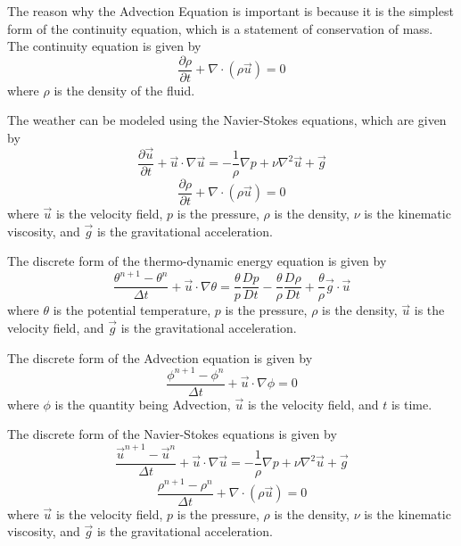 \documentclass{article}
\begin{document}
The reason why the Advection Equation is important is because it is the simplest form of the continuity equation, which is a statement of conservation of mass. The continuity equation is given by
\begin{equation}
\frac{\partial \rho}{\partial t} + \nabla \cdot (\rho \vec{u}) = 0
\end{equation}
where $\rho$ is the density of the fluid.

The weather can be modeled using the Navier-Stokes equations, which are given by
\begin{equation}
\frac{\partial \vec{u}}{\partial t} + \vec{u} \cdot \nabla \vec{u} = -\frac{1}{\rho} \nabla p + \nu \nabla^2 \vec{u} + \vec{g}
\end{equation}
\begin{equation}
\frac{\partial \rho}{\partial t} + \nabla \cdot (\rho \vec{u}) = 0
\end{equation}
where $\vec{u}$ is the velocity field, $p$ is the pressure, $\rho$ is the density, $\nu$ is the kinematic viscosity, and $\vec{g}$ is the gravitational acceleration.

The discrete form of the thermo-dynamic energy equation is given by
\begin{equation}
\frac{\theta^{n+1} - \theta^n}{\Delta t} + \vec{u} \cdot \nabla \theta = \frac{\theta}{p} \frac{D p}{D t} - \frac{\theta}{\rho} \frac{D \rho}{D t} + \frac{\theta}{\rho} \vec{g} \cdot \vec{u}
\end{equation}
where $\theta$ is the potential temperature, $p$ is the pressure, $\rho$ is the density, $\vec{u}$ is the velocity field, and $\vec{g}$ is the gravitational acceleration.

The discrete form of the Advection equation is given by
\begin{equation}
\frac{\phi^{n+1} - \phi^n}{\Delta t} + \vec{u} \cdot \nabla \phi = 0
\end{equation}
where $\phi$ is the quantity being Advection, $\vec{u}$ is the velocity field, and $t$ is time.

The discrete form of the Navier-Stokes equations is given by
\begin{equation}
\frac{\vec{u}^{n+1} - \vec{u}^n}{\Delta t} + \vec{u} \cdot \nabla \vec{u} = -\frac{1}{\rho} \nabla p + \nu \nabla^2 \vec{u} + \vec{g}
\end{equation}
\begin{equation}
\frac{\rho^{n+1} - \rho^n}{\Delta t} + \nabla \cdot (\rho \vec{u}) = 0
\end{equation}
where $\vec{u}$ is the velocity field, $p$ is the pressure, $\rho$ is the density, $\nu$ is the kinematic viscosity, and $\vec{g}$ is the gravitational acceleration.
\end{document}
